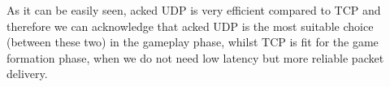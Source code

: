 As it can be easily seen, acked UDP is very efficient compared to TCP and
therefore we can acknowledge that acked UDP is the most suitable choice (between
these two) in the gameplay phase, whilst TCP is fit for the game formation
phase, when we do not need low latency but more reliable packet delivery.
